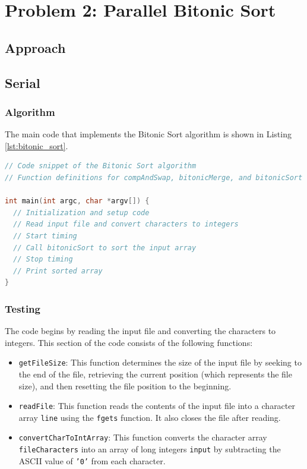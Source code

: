 \section{Problem 2: Parallel Bitonic Sort}
\subsection*{Approach}
\subsection{Serial} 
\subsubsection{Algorithm}
The main code that implements the Bitonic Sort algorithm is shown in Listing \ref{lst:bitonic_sort}.

\begin{lstlisting}[language=C, caption={Bitonic Sort Algorithm}, label={lst:bitonic_sort}]
// Code snippet of the Bitonic Sort algorithm
// Function definitions for compAndSwap, bitonicMerge, and bitonicSort

int main(int argc, char *argv[]) {
  // Initialization and setup code
  // Read input file and convert characters to integers
  // Start timing
  // Call bitonicSort to sort the input array
  // Stop timing
  // Print sorted array
}
\end{lstlisting}

\subsubsection{Testing}
The code begins by reading the input file and converting the characters to integers. This section of the code consists of the following functions:

\begin{itemize}
  \item \texttt{getFileSize}: This function determines the size of the input file by seeking to the end of the file, retrieving the current position (which represents the file size), and then resetting the file position to the beginning.
  \item \texttt{readFile}: This function reads the contents of the input file into a character array \texttt{line} using the \texttt{fgets} function. It also closes the file after reading.
  \item \texttt{convertCharToIntArray}: This function converts the character array \texttt{fileCharacters} into an array of long integers \texttt{input} by subtracting the ASCII value of \texttt{'0'} from each character.
\end{itemize}

